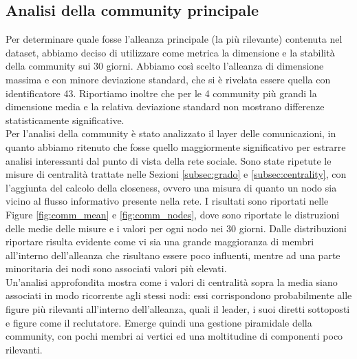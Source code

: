 \subsection{Analisi della community principale}
Per determinare quale fosse l'alleanza principale (la più rilevante) contenuta nel dataset, abbiamo deciso di utilizzare come metrica la dimensione e la stabilità della community sui 30 giorni. Abbiamo così scelto l'alleanza di dimensione massima e con minore deviazione standard, che si è rivelata essere quella con identificatore 43. Riportiamo inoltre che per le 4 community più grandi la dimensione media e la relativa deviazione standard non mostrano differenze statisticamente significative.\\
Per l'analisi della community è stato analizzato il layer delle comunicazioni, in quanto abbiamo ritenuto che fosse quello maggiormente significativo per estrarre analisi interessanti dal punto di vista della rete sociale.
Sono state ripetute le misure di centralità trattate nelle Sezioni \ref{subsec:grado} e \ref{subsec:centrality}, con l'aggiunta del calcolo della closeness, ovvero una misura di quanto un nodo sia vicino al flusso informativo presente nella rete. I risultati sono riportati nelle Figure \ref{fig:comm_mean}  e \ref{fig:comm_nodes}, dove sono riportate le distruzioni delle medie delle misure e i valori per ogni nodo nei 30 giorni. Dalle distribuzioni riportare risulta evidente come vi sia una grande maggioranza di membri all'interno dell'alleanza che risultano essere poco influenti, mentre ad una parte minoritaria dei nodi sono associati valori più elevati.\\
Un'analisi approfondita mostra come i valori di centralità sopra la media siano associati in modo ricorrente agli stessi nodi: essi corrispondono probabilmente alle figure più rilevanti all'interno dell'alleanza, quali il leader, i suoi diretti sottoposti e figure come il reclutatore.
Emerge quindi una gestione piramidale della community, con pochi membri ai vertici ed una moltitudine di componenti poco rilevanti.
